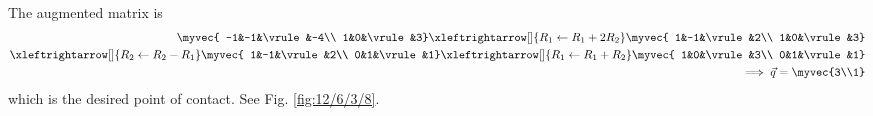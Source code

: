 The augmented matrix is 
\begin{align*}
  \myvec{
                -1&-1&\vrule&-4\\
	        1&0&\vrule&3}
  \xleftrightarrow[]{R_1 \leftarrow R_1+ 2R_2}
     \myvec{
	         1&-1&\vrule&2\\
	         1&0&\vrule&3}
      \\
 \xleftrightarrow[]{R_2 \leftarrow R_2 - R_1}
     \myvec{
	         1&-1&\vrule&2\\
	         0&1&\vrule&1}
 \xleftrightarrow[]{R_1 \leftarrow R_1 + R_2}
     \myvec{
	         1&0&\vrule&3\\
	         0&1&\vrule&1}
      \\ \implies \vec{q}=\myvec{3\\1}
\end{align*}
which is the desired 
point of contact.
See Fig. 
		\ref{fig:12/6/3/8}.
